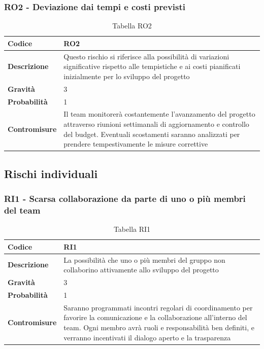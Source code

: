 \documentclass{article}
\begin{document}
    \subsubsection{RO2 - Deviazione dai tempi e costi previsti}
    \begin{table}[h]
        \renewcommand{\arraystretch}{1.5}
        \centering
        \begin{tabular}{|p{3cm}|p{11cm}|}
            \hline
            \textbf{Codice} & RO2 \\
            \hline
            \textbf{Descrizione} & Questo rischio si riferisce alla possibilità di variazioni significative rispetto alle tempistiche e ai costi pianificati inizialmente per lo sviluppo del progetto \\
            \hline
            \textbf{Gravità} & 3 \\
            \hline
            \textbf{Probabilità} & 1 \\
            \hline
            \textbf{Contromisure} & Il team monitorerà costantemente l’avanzamento del progetto attraverso riunioni settimanali di aggiornamento e controllo del budget. Eventuali scostamenti saranno analizzati per prendere tempestivamente le misure correttive \\
            \hline
        \end{tabular}
        \caption{Tabella RO2}
    \end{table}

    \break
    \subsection{Rischi individuali}

    \subsubsection{RI1 - Scarsa collaborazione da parte di uno o più membri del team}
    \begin{table}[h]
        \renewcommand{\arraystretch}{1.5}
        \centering
        \begin{tabular}{|p{3cm}|p{11cm}|}
            \hline
            \textbf{Codice} & RI1 \\
            \hline
            \textbf{Descrizione} & La possibilità che uno o più membri del gruppo non collaborino attivamente allo sviluppo del progetto \\
            \hline
            \textbf{Gravità} & 3 \\
            \hline
            \textbf{Probabilità} & 1 \\
            \hline
            \textbf{Contromisure} & Saranno programmati incontri regolari di coordinamento per favorire la comunicazione e la collaborazione all’interno del team. Ogni membro avrà ruoli e responsabilità ben definiti, e verranno incentivati il dialogo aperto e la trasparenza \\
            \hline
        \end{tabular}
        \caption{Tabella RI1}
    \end{table}
\end{document}
